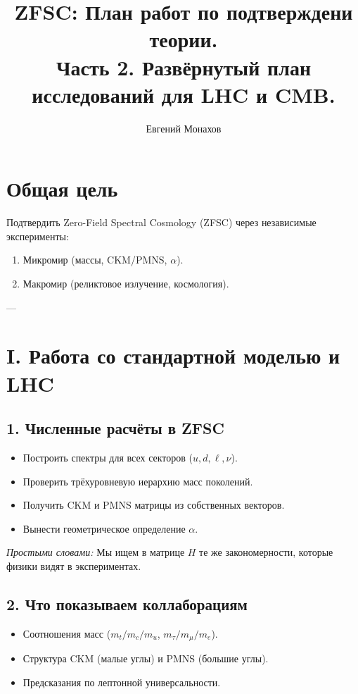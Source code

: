 \documentclass[a4paper,12pt]{article}
\title{ZFSC: План работ по подтверждени теории.\\ Часть 2. Развёрнутый план исследований для LHC и CMB.}
\author{Евгений Монахов}
\date{}
\begin{document}
\maketitle

\section*{Общая цель}
Подтвердить Zero-Field Spectral Cosmology (ZFSC) через независимые эксперименты:
\begin{enumerate}
  \item Микромир (массы, CKM/PMNS, $\alpha$).  
  \item Макромир (реликтовое излучение, космология).  
\end{enumerate}

---

\section*{I. Работа со стандартной моделью и LHC}
\subsection*{1. Численные расчёты в ZFSC}
\begin{itemize}
  \item Построить спектры для всех секторов ($u,d,\ell,\nu$).  
  \item Проверить трёхуровневую иерархию масс поколений.  
  \item Получить CKM и PMNS матрицы из собственных векторов.  
  \item Вынести геометрическое определение $\alpha$.
\end{itemize}

\textit{Простыми словами:}  
Мы ищем в матрице $H$ те же закономерности, которые физики видят в экспериментах.

\subsection*{2. Что показываем коллаборациям}
\begin{itemize}
  \item Соотношения масс ($m_t/m_c/m_u$, $m_\tau/m_\mu/m_e$).  
  \item Структура CKM (малые углы) и PMNS (большие углы).  
  \item Предсказания по лептонной универсальности.  
\end{itemize}
\end{document}
